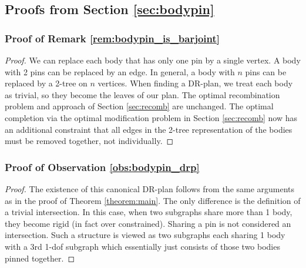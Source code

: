 \subsection{Proofs from Section \ref{sec:bodypin}}

\subsubsection{Proof of Remark \ref{rem:bodypin_is_barjoint}}
\begin{proof}
    We can replace each body that has only one pin by a single vertex. A body with 2 pins can be replaced by an edge. In general, a body with $n$ pins can be replaced by a 2-tree on $n$ vertices. When finding a DR-plan, we treat each body as trivial, so they become the leaves of our plan. The optimal recombination problem and approach of Section \ref{sec:recomb} are unchanged. The optimal completion via the optimal modification problem in Section \ref{sec:recomb} now has an additional constraint that all edges in the 2-tree representation of the bodies must be removed together, not individually.
\end{proof}

\subsubsection{Proof of Observation \ref{obs:bodypin_drp}}
\begin{proof}
    The existence of this canonical DR-plan follows from the same arguments as in the proof of Theorem \ref{theorem:main}. The only difference is the definition of a trivial intersection. In this case, when two subgraphs share more than 1 body, they become rigid (in fact over constrained). Sharing a pin is not considered an intersection. Such a structure is viewed as two subgraphs each sharing 1 body with a 3rd 1-dof subgraph which essentially just consists of those two bodies pinned together.
\end{proof}

